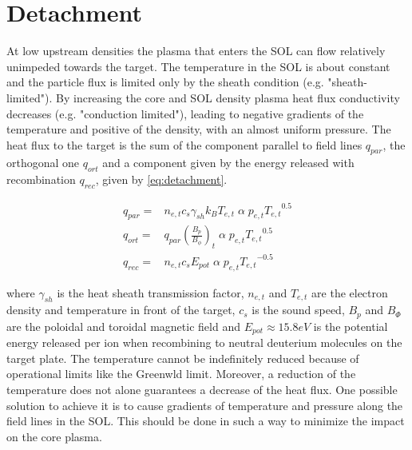 \section{Detachment}\label{Detachment}

At low upstream densities the plasma that enters the SOL can flow relatively unimpeded towards the target. The temperature in the SOL is about constant and the particle flux is limited only by the sheath condition (e.g. "sheath-limited"). By increasing the core and SOL density plasma heat flux conductivity decreases (e.g. "conduction limited"), leading to negative gradients of the temperature and positive of the density, with an almost uniform pressure. The heat flux to the target is the sum of the component parallel to field lines $q_{par}$, the orthogonal one $q_{ort}$ and a component given by the energy released with recombination $q_{rec}$, given by  \autoref{eq:detachment}.

\begin{equation}
\begin{aligned}
{ q } _{ par } =& { n } _{ e,t } { c } _{ s } {  \gamma  } _{ sh }{ k } _{ B }{ T } _{ e,t } \; \alpha \; { p } _{ e,t }{{ T } _{ e,t }}^{0.5 } \\
{ q } _{ ort } =& { q } _{ par } \left( \frac {{ B } _{ p }} {{  B  }_{ \phi  }}   \right) _{ t} \; \alpha \; { p } _{ e,t }{{ T } _{ e,t }}^{0.5 } \\
{ q } _{ rec } =& { n } _{ e,t } { c } _{ s } {  E  } _{ pot } \; \alpha \; { p } _{ e,t }{{ T } _{ e,t }}^{-0.5 }
\end{aligned}
\label{eq:detachment}
\end{equation}

where $\gamma_{sh}$ is the heat sheath transmission factor, $n_{e,t}$ and $T_{e,t}$ are the electron density and temperature in front of the target, $c_s$ is the sound speed, $B_p$ and $B_{\Phi}$ are the poloidal and toroidal magnetic field and $E_{pot} \approx 15.8 eV$ is the potential energy released per ion when recombining to neutral deuterium molecules on the target plate. \cite{Reimold2015} The temperature cannot be indefinitely reduced because of operational limits like the Greenwld limit.\cite{Greenwald1988} Moreover, a reduction of the temperature does not alone guarantees a decrease of the heat flux.  One possible solution to achieve it is to cause gradients of temperature and pressure along the field lines in the SOL. This should be done in such a way to minimize the impact on the core plasma.

